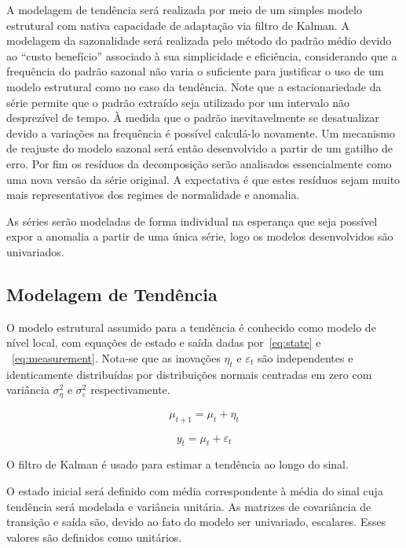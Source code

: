 A modelagem de tendência será realizada por meio de um simples modelo
estrutural com nativa capacidade de adaptação via filtro de Kalman. A modelagem
da sazonalidade será realizada pelo método do padrão médio devido ao ``custo
benefício'' associado à sua simplicidade e eficiência, considerando que a
frequência do padrão sazonal não varia o suficiente para justificar o uso de
um modelo estrutural como no caso da tendência. Note
que a estacionariedade da série permite que o padrão extraído seja utilizado
por um intervalo não desprezível de tempo. À medida que o padrão
inevitavelmente se desatualizar devido a variações na frequência é possível
calculá-lo novamente. Um mecanismo de reajuste do modelo sazonal será então
desenvolvido a partir de um gatilho de erro. Por fim os resíduos da
decomposição serão analisados essencialmente como uma nova versão da série
original. A expectativa é que estes resíduos sejam muito mais representativos
dos regimes de normalidade e anomalia.

As séries serão modeladas de forma individual na esperança que seja possível
expor a anomalia a partir de uma única série, logo os modelos desenvolvidos
são univariados.

\subsection{Modelagem de Tendência}

O modelo estrutural assumido para a tendência é conhecido como modelo de nível
local, com equações de estado e saída dadas por~\ref{eq:state} e
~\ref{eq:measurement}. Nota-se que as inovações $\eta_t$ e $\varepsilon_t$ são
independentes e identicamente distribuídas por distribuições normais centradas
em zero com variância $\sigma^2_{\eta}$ e $\sigma^2_{\varepsilon}$
respectivamente.

\begin{equation}\label{eq:state}
    \mu_{t+1} = \mu_t + \eta_t
\end{equation}

\begin{equation}\label{eq:measurement}
    y_t = \mu_t + \varepsilon_t
\end{equation}

O filtro de Kalman é usado para estimar a tendência ao longo do sinal.

O estado inicial será definido com média correspondente à média do sinal cuja
tendência será modelada e variância unitária. As matrizes de covariância de
transição e saída são, devido ao fato do modelo ser univariado, escalares.
Esses valores são definidos como unitários.

